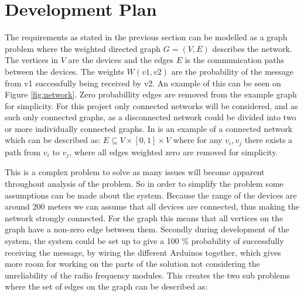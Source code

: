 \section{Development Plan}

\noindent The requirements as stated in the previous section can be modelled as a graph problem where the weighted directed graph $G = (V, E)$ describes the network. 
The vertices in $V$ are the devices and the edges $E$ is the communication paths between the devices. 
The weights $W(v1, v2)$ are the probability of the message from v1 successfully being received by v2.
An example of this can be seen on Figure \ref{fig:network}.
Zero probabillity edges are removed from the example graph for simplicity. 
For this project only  connected networks will be considered, and as such only  connected graphs, as a disconnected network could be divided into two or more individually connected graphs. 
In  is an example of a connected network which can be described as: $E \subseteq V \times [0,1] \times V$ where for any $v_i, v_j$ there exists a path from $v_i$ to $v_j$, where all edges weighted zero are removed for simplicity. 


\noindent This is a complex problem to solve as many issues will become apparent throughout analysis of the problem.
So in order to simplify the problem some assumptions can be made about the system.
Because the range of the devices are around 200 meters we can assume that all devices are connected, thus making the network strongly connected. 
For the graph this means that all vertices on the graph have a non-zero edge between them.
Secondly during development of the system, the system could be set up to give a 100 \% probability of successfully receiving the message, by wiring the different Arduinos together, which gives more room for working on the parts of the solution not considering the unreliability of the radio frequency modules. 
This creates the two sub problems where the set of edges on the graph can be described as: 


